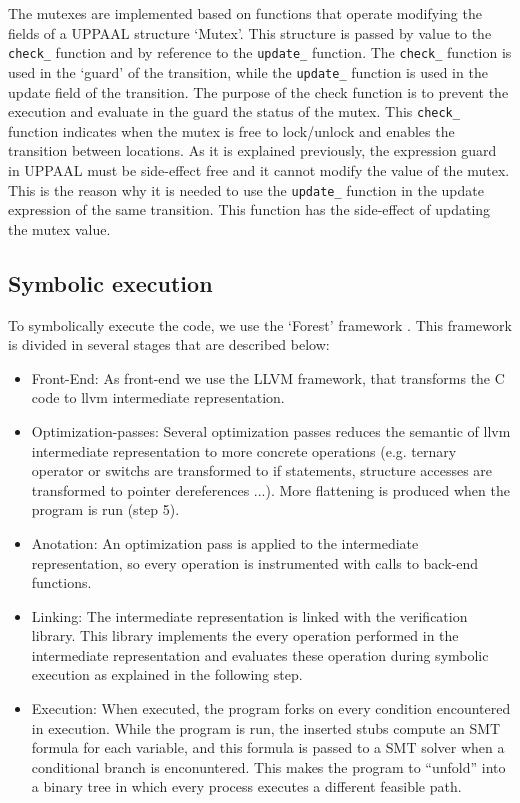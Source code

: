 \documentclass[conference]{IEEEtran}
\begin{document}
The mutexes are implemented based on functions that operate modifying the fields of a UPPAAL structure `Mutex'. This structure is passed by value to the \verb+check_+ function and by reference to the \verb+update_+ function. The \verb+check_+ function is used in the `guard' of the transition, while the \verb+update_+ function is used in the update field of the transition. The purpose of the check function is to prevent the execution and evaluate in the guard the status of the mutex. This \verb+check_+ function indicates when the mutex is free to lock/unlock and enables the transition between locations. As it is explained previously, the expression guard in UPPAAL must be side-effect free and it cannot modify the value of the mutex. This is the reason why it is needed to use the \verb+update_+ function in the update expression of the same transition. This function has the side-effect of updating the mutex value.


\subsection{Symbolic execution}


To symbolically execute the code, we use the `Forest' framework \cite{forest_tacas}. This framework is divided in several stages that are described below:

\begin{itemize}
	\item Front-End:  As front-end we use the LLVM framework, that transforms the C code to llvm intermediate representation. 
	\item Optimization-passes: Several optimization passes reduces the semantic of llvm intermediate representation to more concrete operations (e.g. ternary operator or switchs are transformed to if statements, structure accesses are transformed to pointer dereferences ...). More flattening is produced when the program is run (step 5). 
	\item Anotation: An optimization pass is applied to the intermediate representation, so every operation is instrumented with calls to back-end functions.
	\item Linking: The intermediate representation is linked with the verification library. This library implements the every operation performed in the intermediate representation and evaluates these operation during symbolic execution as explained in the following step.
	\item Execution: When executed, the program forks on every condition encountered in execution. While the program is run, the inserted stubs compute an SMT formula for each variable, and this formula is passed to a SMT solver when a conditional branch is enconuntered. This makes the program to ``unfold'' into a binary tree in which every process executes a different feasible path.
\end{itemize}
\end{document}

